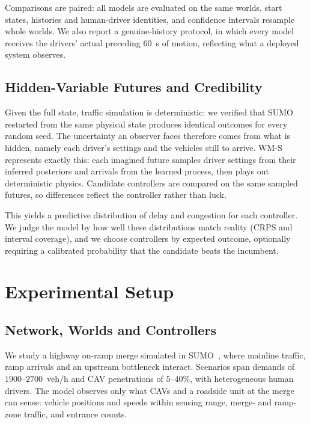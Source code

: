 \documentclass[conference]{IEEEtran}
\begin{document}
Comparisons are paired: all models are evaluated on the same worlds, start states, histories and human-driver identities, and confidence intervals resample whole worlds. We also report a genuine-history protocol, in which every model receives the drivers' actual preceding $60$~s of motion, reflecting what a deployed system observes. %

\subsection{Hidden-Variable Futures and Credibility}
Given the full state, traffic simulation is deterministic: we verified that SUMO restarted from the same physical state produces identical outcomes for every random seed. The uncertainty an observer faces therefore comes from what is hidden, namely each driver's settings and the vehicles still to arrive. WM-S represents exactly this: each imagined future samples driver settings from their inferred posteriors and arrivals from the learned process, then plays out deterministic physics. Candidate controllers are compared on the same sampled futures, so differences reflect the controller rather than luck.

This yields a predictive distribution of delay and congestion for each controller. We judge the model by how well these distributions match reality (CRPS and interval coverage), and we choose controllers by expected outcome, optionally requiring a calibrated probability that the candidate beats the incumbent.

\section{Experimental Setup}
\subsection{Network, Worlds and Controllers}
We study a highway on-ramp merge simulated in SUMO~\cite{lopez_sumo}, where mainline traffic, ramp arrivals and an upstream bottleneck interact. Scenarios span demands of $1900$--$2700$~veh/h and CAV penetrations of $5$--$40\%$, with heterogeneous human drivers. %
The model observes only what CAVs and a roadside unit at the merge can sense: vehicle positions and speeds within sensing range, merge- and ramp-zone traffic, and entrance counts.
\end{document}
